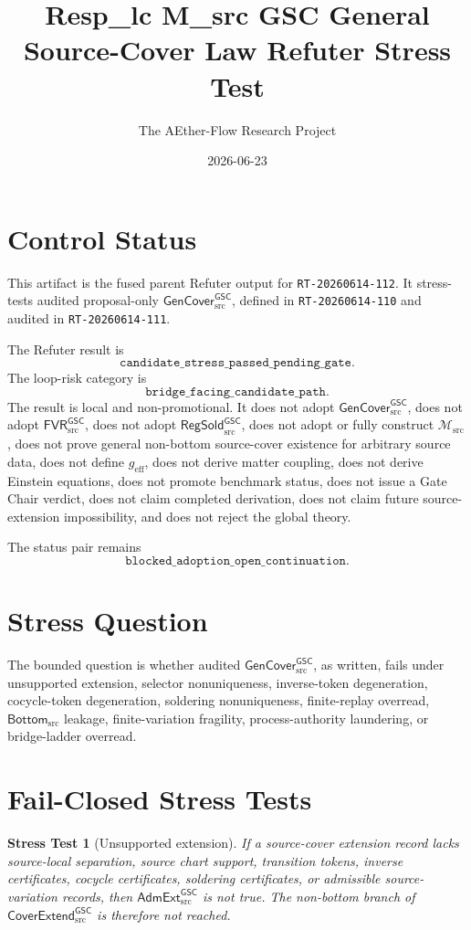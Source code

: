 \documentclass[11pt]{article}
\title{Resp\_lc M\_src GSC General Source-Cover Law Refuter Stress Test}
\author{The AEther-Flow Research Project}
\date{2026-06-23}
\newcommand{\Msrc}{\mathcal{M}_{\mathrm{src}}}
\newcommand{\geff}{g_{\mathrm{eff}}}
\newcommand{\RegSold}{\mathsf{RegSold}_{\mathrm{src}}^{\mathsf{GSC}}}
\newcommand{\FVRSrc}{\mathsf{FVR}_{\mathrm{src}}^{\mathsf{GSC}}}
\newcommand{\GenCover}{\mathsf{GenCover}_{\mathrm{src}}^{\mathsf{GSC}}}
\newcommand{\AdmExt}{\mathsf{AdmExt}_{\mathrm{src}}^{\mathsf{GSC}}}
\newcommand{\CoverExt}{\mathsf{CoverExtend}_{\mathrm{src}}^{\mathsf{GSC}}}
\newcommand{\BottomSrc}{\mathsf{Bottom}_{\mathrm{src}}}
\newtheorem{stress}{Stress Test}
\begin{document}
\maketitle

\section*{Control Status}

This artifact is the fused parent Refuter output for
\texttt{RT-20260614-112}. It stress-tests audited proposal-only
\(\GenCover\), defined in \texttt{RT-20260614-110} and audited in
\texttt{RT-20260614-111}.

The Refuter result is
\[
  \texttt{candidate\_stress\_passed\_pending\_gate}.
\]
The loop-risk category is
\[
  \texttt{bridge\_facing\_candidate\_path}.
\]
The result is local and non-promotional. It does not adopt \(\GenCover\),
does not adopt \(\FVRSrc\), does not adopt \(\RegSold\), does not adopt or
fully construct \(\Msrc\), does not prove general non-bottom source-cover
existence for arbitrary source data, does not define \(\geff\), does not
derive matter coupling, does not derive Einstein equations, does not promote
benchmark status, does not issue a Gate Chair verdict, does not claim
completed derivation, does not claim future source-extension impossibility,
and does not reject the global theory.

The status pair remains
\[
  \texttt{blocked\_adoption\_open\_continuation}.
\]

\section{Stress Question}

The bounded question is whether audited \(\GenCover\), as written, fails under
unsupported extension, selector nonuniqueness, inverse-token degeneration,
cocycle-token degeneration, soldering nonuniqueness, finite-replay overread,
\(\BottomSrc\) leakage, finite-variation fragility, process-authority
laundering, or bridge-ladder overread.

\section{Fail-Closed Stress Tests}

\begin{stress}[Unsupported extension]
If a source-cover extension record lacks source-local separation, source chart
support, transition tokens, inverse certificates, cocycle certificates,
soldering certificates, or admissible source-variation records, then
\(\AdmExt\) is not true. The non-bottom branch of \(\CoverExt\) is therefore
not reached.
\end{stress}
\end{document}
